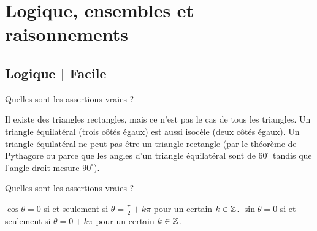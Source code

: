 


\section{Logique, ensembles et raisonnements}


\subsection{Logique | Facile}


\begin{question}
Quelles sont les assertions vraies ?
\begin{answers} 
\end{answers}
\begin{explanations} 
Il existe des triangles rectangles, mais ce n'est pas le cas de tous les triangles.
Un triangle équilatéral (trois côtés égaux) est aussi isocèle (deux côtés égaux). 
Un triangle équilatéral ne peut pas être un triangle rectangle (par le théorème de Pythagore ou parce que les angles d'un triangle équilatéral sont de $60^\circ$ tandis que l'angle droit mesure $90^\circ$).	
\end{explanations}
\end{question}


\begin{question}
Quelles sont les assertions vraies ?	
\begin{answers} 
\end{answers}
\begin{explanations} 
$\cos\theta=0$  si et seulement si $\theta=\frac\pi2 + k\pi$ pour un certain $k\in\mathbb{Z}$.
$\sin\theta=0$  si et seulement si $\theta=0 + k\pi$ pour un certain $k\in\mathbb{Z}$.	
\end{explanations}
\end{question}



